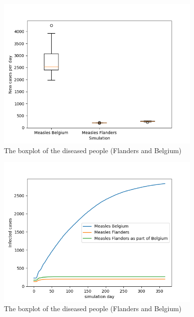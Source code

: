 \documentclass[runningheads]{llncs}
\begin{document}
	\begin{figure}
		\centering
		\centering
		\includegraphics[width=0.9\textwidth]{BE_sim_boxplot.png}
		\caption{The boxplot of the diseased people (Flanders and Belgium)}	
		\label{fig15}
	\end{figure}	
	\begin{figure}
		\centering
		\centering
		\includegraphics[width=0.9\textwidth]{BE_sim_infected_cases.png}
		\caption{The boxplot of the diseased people (Flanders and Belgium)}	
		\label{fig16}
	\end{figure}
\end{document}
